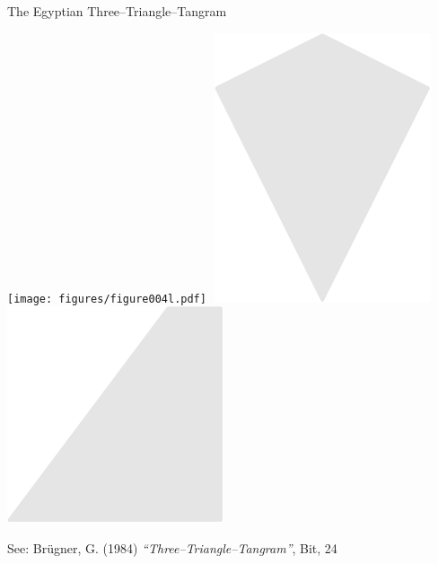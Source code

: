 \documentclass[14pt]{beamer}
\begin{document}
\begin{frame}{The Egyptian Three--Triangle--Tangram}
\begin{center}
            \bigskip\bigskip\smallskip

            \texttt{[image: figures/figure004l.pdf]}\qquad\,\,
            \includegraphics[scale=0.39]{figures/figure004j.pdf}\qquad\;\,
            \includegraphics[scale=0.39]{figures/figure004g.pdf}\;\;\;\;\phantom{.}\\

            \bigskip\medskip

            {\footnotesize See: Brügner, G. (1984) \emph{``Three--Triangle--Tangram''}, Bit, 24}
        \end{center}
    \end{frame}

\end{document}
